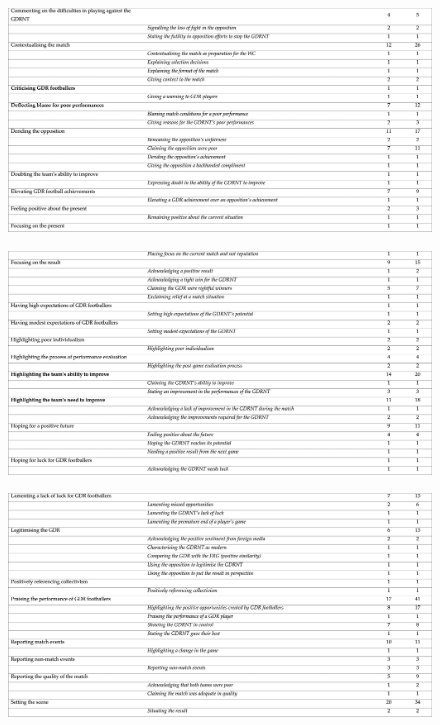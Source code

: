 \begin{landscape}
\begin{figure}[h]
\centering
\bigskip\bigskip\bigskip\bigskip\bigskip
\includegraphics[width=\linewidth]{mres/images/appendix/a3.png}
\end{figure}
\end{landscape}

\begin{landscape}
\begin{figure}[h]
\centering
\bigskip\bigskip\bigskip\bigskip\bigskip
\includegraphics[width=\linewidth]{mres/images/appendix/a4.png}
\end{figure}
\end{landscape}

\begin{landscape}
\begin{figure}[h]
\centering
\bigskip\bigskip\bigskip\bigskip\bigskip
\includegraphics[width=\linewidth]{mres/images/appendix/a5.png}
\end{figure}
\end{landscape}

